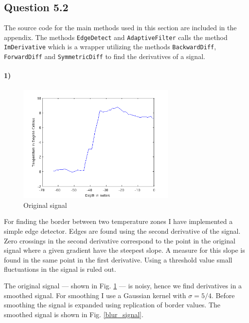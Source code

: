 \documentclass[a4paper, 10pt, final]{article}
\begin{document}
\subsection*{Question 5.2}
The source code for the main methods used in this section are included
in the appendix. The methods \texttt{EdgeDetect} and
\texttt{AdaptiveFilter} calls the method \texttt{ImDerivative} which is
a wrapper utilizing the methods \texttt{BackwardDiff},
\texttt{ForwardDiff} and \texttt{SymmetricDiff} to find the derivatives
of a signal.

\paragraph{1)}

\begin{figure}[!h]
    \centering
    \includegraphics[angle=0,width=0.7\textwidth]{images/org_signal}
    \caption[]{Original signal}
    \label{org_signal}
\end{figure}

For finding the border between two temperature zones I have implemented
a simple edge detector. Edges are found using the second derivative of
the signal. Zero crossings in the second derivative correspond to the
point in the original signal where a given gradient have the steepest
slope. A measure for this slope is found in the same point in the first
derivative. Using a threshold value small fluctuations in the signal is
ruled out.

The original signal --- shown in Fig. \ref{org_signal} --- is noisy,
hence we find derivatives in a smoothed signal. For smoothing I use a
Gaussian kernel with $\sigma = 5/4$.  Before smoothing the signal is
expanded using replication of border values. The smoothed signal is
shown in Fig. \ref{blur_signal}.
\end{document}
